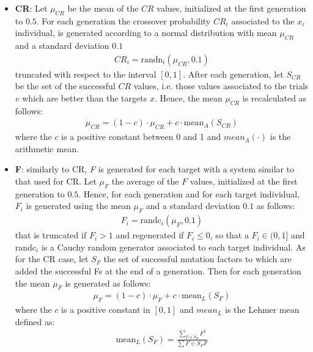 \begin{itemize}
	\item{\textbf{CR}: Let $\mu_{\textit{CR}}$ be the mean of the $CR$ values, initialized at the first generation to $0.5$. For each generation the crossover probability $\textit{CR}_{i}$ associated to the $x_{i}$ individual, is generated according to a normal distribution with mean $\mu_{CR}$ and a standard deviation $0.1$
	\begin{align}
		\textit{CR}_{i} = \textrm{randn}_{i}(\mu_{\textit{CR}}, 0.1)
	\end{align}
	truncated with respect to the interval $[0, 1]$. \newline\newline
	After each generation, let $S_{CR}$ be the set of the successful $CR$ values, i.e. those values associated to the trials $v$ which are better than the targets $x$. Hence, the mean $\mu_{\textit{CR}}$ is recalculated as follows:
	\begin{align}
		\mu_{\textit{CR}} = (1 - c)\cdot\mu_{\textit{CR}} + c\cdot\textrm{mean}_{A}(S_{\textit{CR}})
	\end{align}
	where the $c$ is a positive constant between 0 and 1 and $mean_{A}(\cdot)$ is the arithmetic mean.	
	}
	\item{\textbf{F}: similarly to CR, \textit{F} is generated for each target with a system similar to that used for CR. Let $\mu_{F}$ the average of the $F$ values, initialized at the first generation to $0.5$. Hence, for each generation and for each target individual,  $F_{i}$ is generated using the mean $\mu_{F}$ and a standard deviation $0.1$ as follows:
		\begin{align}
			F_{i} = \textrm{randc}_{i}(\mu_{F}, 0.1)
		\end{align}
		that is truncated if $F_{i} > 1$ and regenerated if $F_{i} \leq 0$, so that a $F_{i} \in (0, 1]$ and $\textrm{randc}_{i}$ is a Cauchy random generator associated to each target individual.\newline\newline
As for the CR case, let $S_{\textit{F}}$ the set of successful mutation factors to which are added the successful Fs at the end of a generation. Then for each generation the mean $\mu_{F}$ is generated as follows:
		\begin{align}
			\mu_{F} = (1 - c)\cdot\mu_{F} + c\cdot\textrm{mean}_{L}(S_{F})
		\end{align}
		where the $c$ is a positive constant in $[0, 1]$ and $\textit{mean}_{L}$ is the Lehmer mean defined as:
		\begin{align}
			\textrm{mean}_{L}(S_{F}) = \frac{\sum_{F \in S_{F}}F^{2}}{\sum\limits{F \in S_{F}}F} 
		\end{align}
		}
\end{itemize}

